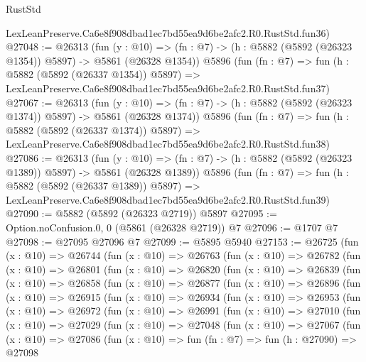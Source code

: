\begin{lexlean}{RustStd}
\begin{coremodule}
    LexLeanPreserve.Ca6e8f908dbad1ec7bd55ea9d6be2afc2.R0.RustStd.fun36)
@27048 := @26313
    (fun (y : @10) => (fn : @7) -> (h : @5882 (@5892 (@26323 @1354)) @5897) -> @5861 (@26328 @1354))
    @5896
    (fun (fn : @7) =>
    fun (h : @5882 (@5892 (@26337 @1354)) @5897) =>
    LexLeanPreserve.Ca6e8f908dbad1ec7bd55ea9d6be2afc2.R0.RustStd.fun37)
@27067 := @26313
    (fun (y : @10) => (fn : @7) -> (h : @5882 (@5892 (@26323 @1374)) @5897) -> @5861 (@26328 @1374))
    @5896
    (fun (fn : @7) =>
    fun (h : @5882 (@5892 (@26337 @1374)) @5897) =>
    LexLeanPreserve.Ca6e8f908dbad1ec7bd55ea9d6be2afc2.R0.RustStd.fun38)
@27086 := @26313
    (fun (y : @10) => (fn : @7) -> (h : @5882 (@5892 (@26323 @1389)) @5897) -> @5861 (@26328 @1389))
    @5896
    (fun (fn : @7) =>
    fun (h : @5882 (@5892 (@26337 @1389)) @5897) =>
    LexLeanPreserve.Ca6e8f908dbad1ec7bd55ea9d6be2afc2.R0.RustStd.fun39)
@27090 := @5882 (@5892 (@26323 @2719)) @5897
@27095 := Option.noConfusion.{0, 0} (@5861 (@26328 @2719)) @7
@27096 := @1707 @7
@27098 := @27095 @27096 @7
@27099 := @5895 @5940
@27153 := @26725
    (fun (x : @10) =>
    @26744
      (fun (x : @10) =>
      @26763
        (fun (x : @10) =>
        @26782
          (fun (x : @10) =>
          @26801
            (fun (x : @10) =>
            @26820
              (fun (x : @10) =>
              @26839
                (fun (x : @10) =>
                @26858
                  (fun (x : @10) =>
                  @26877
                    (fun (x : @10) =>
                    @26896
                      (fun (x : @10) =>
                      @26915
                        (fun (x : @10) =>
                        @26934
                          (fun (x : @10) =>
                          @26953
                            (fun (x : @10) =>
                            @26972
                              (fun (x : @10) =>
                              @26991
                                (fun (x : @10) =>
                                @27010
                                  (fun (x : @10) =>
                                  @27029
                                    (fun (x : @10) =>
                                    @27048
                                      (fun (x : @10) =>
                                      @27067
                                        (fun (x : @10) =>
                                        @27086
                                          (fun (x : @10) =>
                                          fun (fn : @7) =>
                                          fun (h : @27090) =>
                                          @27098

\end{coremodule}
\end{lexlean}
